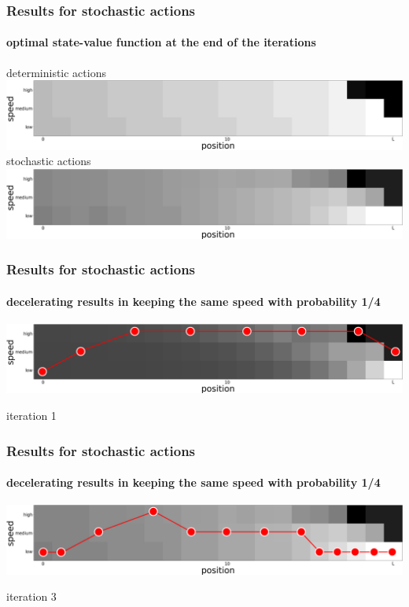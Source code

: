 \documentclass[dvipsnames,svgnames]{beamer}
\begin{document}
\begin{frame}
\frametitle{Results for stochastic actions}
\framesubtitle{optimal state-value function at the end of the iterations
}
\centering
deterministic actions\\
\vspace{0.1cm}
\includegraphics[scale=0.12]{img/value6.jpg}\\
\vspace{0.3cm}
stochastic actions\\
\vspace{0.1cm}
\includegraphics[scale=0.12]{img/state_values_sto4.jpg}
\end{frame}

\begin{frame}
\frametitle{Results for stochastic actions}
\framesubtitle{decelerating  results in keeping the same speed with probability 1/4}
\centering
\includegraphics[scale=0.12]{img/state_values_sto1_traj.jpg}
\begin{block}{}
\centering
iteration 1
\end{block}
\end{frame}

\begin{frame}
\frametitle{Results for stochastic actions}
\framesubtitle{decelerating  results in keeping the same speed with probability 1/4}
\centering
\includegraphics[scale=0.12]{img/state_values_sto3_traj.jpg}
\begin{block}{}
\centering
iteration 3 
\end{block}
\end{frame}
\end{document}
